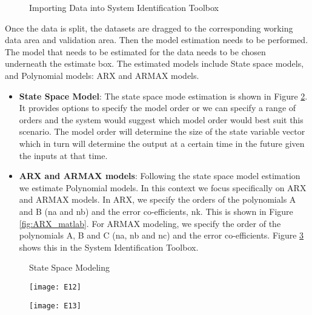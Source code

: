 \documentclass[article,type=msc,colorback,12pt,accentcolor=tud8b,table]{tudthesis}
\begin{document}
    \begin{figure}[h]
    	\begin{center}
    		\makebox[\textwidth]{\texttt{[image: D6]}}
    	\end{center}
    	\caption{Importing Data into System Identification Toolbox}
    	\label{fig:dataset_import}
    \end{figure}	
 Once the data is split, the datasets are dragged to the corresponding working data area and validation area. Then the model estimation needs to be performed. The model that needs to be estimated for the data needs to be chosen underneath the estimate box. The estimated models include State space models, and Polynomial models: ARX and ARMAX models.
	\begin{itemize}
		\item{\textbf{State Space Model}:} The state space mode estimation is shown in Figure \ref{fig:state_space_matlab}. It provides options to specify the model order or we can specify a range of orders and the system would suggest which model order would best suit this scenario. The model order will determine the size of the state variable vector which in turn will determine the output at a certain time in the future given the inputs at that time.
		
		\item{\textbf{ARX and ARMAX models}:} 	Following the state space model estimation we estimate Polynomial models. In this context we focus specifically on ARX and ARMAX models. In ARX, we specify the orders of the polynomials A and B (na and nb) and the error co-efficients, nk. This is shown in Figure \ref{fig:ARX_matlab}. For ARMAX modeling, we specify the order of the polynomials A, B and C (na, nb and nc) and the error co-efficients. Figure \ref{fig:ARMAX_matlab} shows this in the System Identification Toolbox.
		
	\end{itemize}
	
	\begin{figure}[H]
		\begin{center}
			\makebox[\textwidth]{\texttt{[image: E11]}}
		\end{center}
		\caption{State Space Modeling}
		\label{fig:state_space_matlab}
	\end{figure}
	
	\begin{figure}[H]
		\centering
		\begin{minipage}{.5\textwidth}
			\centering
			\texttt{[image: E12]}
			\label{fig:ARX_matlab}
			
		\end{minipage}%
		\begin{minipage}{.5\textwidth}
			\centering
			\texttt{[image: E13]}
			\label{fig:ARMAX_matlab}
		\end{minipage}
	\end{figure}
 
\end{document}
